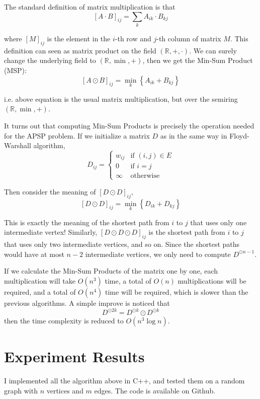 \documentclass[11pt]{article}
\theoremstyle{plain}
\begin{document}
The standard definition of matrix multiplication is that
\[
  [A\cdot B]_{ij} = \sum_{k} A_{ik} \cdot B_{kj}
\]

where $[M]_{ij}$ is the element in the $i$-th row and $j$-th column of matrix $M$.
This definition can seen as matrix product on the field $(\mathbb{R}, +, \cdot)$.
We can surely change the underlying field to $(\mathbb{R}, \min, +)$, then we get the
Min-Sum Product (MSP):
\[
  [A\odot B]_{ij} = \min_{k} \left\{ A_{ik} + B_{kj} \right\} 
\]

i.e. above equation is the usual matrix multiplication, but over the semiring $(\mathbb{R}, \min, +)$.

It turns out that computing Min-Sum Products is precisely the operation needed for the APSP problem.
If we initialize a matrix $D$ as in the same way in Floyd-Warshall algorithm,
\[
  D_{ij} = \begin{cases}
    w_{ij} & \text{if } (i, j) \in E \\
    0 & \text{if } i = j \\
    \infty & \text{otherwise}
  \end{cases}
\]

Then consider the meaning of $[D \odot D]_{ij}$,
\[
  [D \odot D]_{ij} = \min_{k} \left\{ D_{ik} + D_{kj} \right\}
\]

This is exactly the meaning of the shortest path from $i$ to $j$ that uses only one intermediate vertex!
Similarly, $[D \odot D \odot D]_{ij}$ is the shortest path from $i$ to $j$ that uses only two intermediate vertices, and so on.
Since the shortest paths would have at most $n-2$ intermediate vertices, we only need to compute $D^{\odot n-1}$.

If we calculate the Min-Sum Products of the matrix one by one, each multiplication will take $O(n^3)$ time, 
a total of $O(n)$ multiplications will be required, and a total of $O(n^4)$ time will be required, which is 
slower than the previous algorithms. A simple improve is noticed that 
\[
  D^{\odot 2k} = D^{\odot k}\odot D^{\odot k}
\]
then the time complexity is reduced to $O(n^3 \log n)$.

\section{Experiment Results}

I implemented all the algorithm above in C++, and tested them on a random graph with $n$ vertices and $m$ edges.
The code is available on Github.

\end{document}
